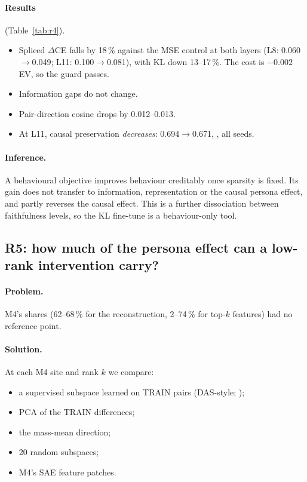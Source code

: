 \paragraph{Results} (Table~\ref{tab:r4}).
\begin{itemize}
\item Spliced $\Delta$CE falls by 18\,\% against the MSE control at both layers (L8: 0.060$\to$0.049; L11:
  0.100$\to$0.081), with KL down 13--17\,\%. The cost is $-0.002$ EV, so the guard passes.
\item Information gaps do not change.
\item Pair-direction cosine drops by 0.012--0.013.
\item At L11, causal preservation \emph{decreases}: 0.694$\to$0.671, , all seeds.
\end{itemize}

\paragraph{Inference.} A behavioural objective improves behaviour creditably once sparsity is fixed. Its gain does not
transfer to information, representation or the causal persona effect, and partly reverses the causal effect. This is a
further dissociation between faithfulness levels, so the KL fine-tune is a behaviour-only tool.



\subsection{R5: how much of the persona effect can a low-rank intervention carry?}\label{sec:r5}

\paragraph{Problem.} M4's shares (62--68\,\% for the reconstruction, 2--74\,\% for top-$k$ features) had no
reference point.

\paragraph{Solution.} At each M4 site and rank $k$ we compare:
\begin{itemize}
\item a supervised subspace learned on TRAIN pairs (DAS-style; \citealp{chaudhary2024evaluating});
\item PCA of the TRAIN differences;
\item the mass-mean direction;
\item 20 random subspaces;
\item M4's SAE feature patches.
\end{itemize}

